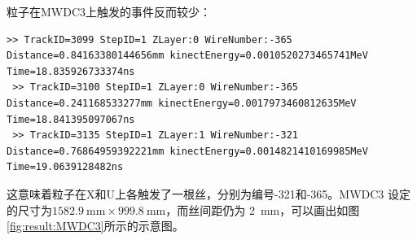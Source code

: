 \documentclass[bachelor,openany,oneside,color]{buaathesis}
\begin{document}
%
%
粒子在MWDC3上触发的事件反而较少：

\begin{lstlisting}[caption={MWDC3},firstnumber=4213,lastline=4215]
 >> TrackID=3099 StepID=1 ZLayer:0 WireNumber:-365 Distance=0.84163380144656mm kinectEnergy=0.0010520273465741MeV Time=18.835926733374ns
 >> TrackID=3100 StepID=1 ZLayer:0 WireNumber:-365 Distance=0.241168533277mm kinectEnergy=0.0017973460812635MeV Time=18.841395097067ns
 >> TrackID=3135 StepID=1 ZLayer:1 WireNumber:-321 Distance=0.76864959392221mm kinectEnergy=0.0014821410169985MeV Time=19.0639128482ns
\end{lstlisting}

这意味着粒子在X和U上各触发了一根丝，分别为编号-321和-365。MWDC3
设定的尺寸为$\SI{1582.9}{\milli\meter}\times\SI{999.8}{\milli\meter}$，而丝间距仍为
\SI{2}{\milli\meter}，可以画出如图\ref{fig:result:MWDC3}所示的示意图。
\end{document}

